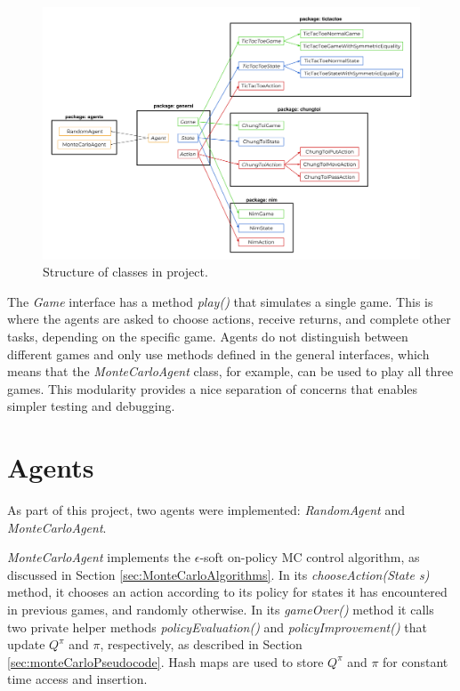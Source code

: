 \documentclass[11pt,a4paper]{report}
\begin{document}
\begin{figure}[htbp]
	\begin{center}
		\includegraphics[width=125mm]{code_structure.png}
		\caption{Structure of classes in project.}
		\label{code-structure}
	\end{center}
\end{figure}

The \emph{Game} interface has a method \emph{play()} that simulates a single game. This is where the agents are asked to choose actions, receive returns, and complete other tasks, depending on the specific game. Agents do not distinguish between different games and only use methods defined in the general interfaces, which means that the \emph{MonteCarloAgent} class, for example, can be used to play all three games. This modularity provides a nice separation of concerns that enables simpler testing and debugging.


\section{Agents}
\label{sec:Agents}

As part of this project, two agents were implemented: \emph{RandomAgent} and \emph{MonteCarloAgent}. 

\emph{MonteCarloAgent} implements the $\epsilon$-soft on-policy MC control algorithm, as discussed in Section \ref{sec:MonteCarloAlgorithms}. In its \emph{chooseAction(State s)} method, it chooses an action according to its policy for states it has encountered in previous games, and randomly otherwise. In its \emph{gameOver()} method it calls two private helper methods \emph{policyEvaluation()} and \emph{policyImprovement()} that update $Q^{\pi}$ and $\pi$, respectively, as described in Section \ref{sec:monteCarloPseudocode}. Hash maps are used to store $Q^{\pi}$ and $\pi$ for constant time access and insertion.
\end{document}
